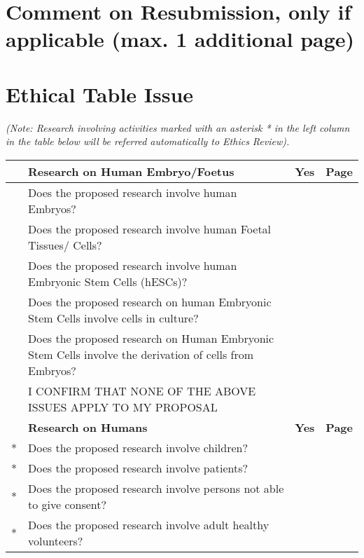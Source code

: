 \documentclass[11pt,twoside,a4paper]{article}
\begin{document}
\section{Comment on Resubmission, only if applicable (max. 1 additional page)}


\section*{Ethical Table Issue}

\emph{(Note: Research involving activities marked with an asterisk * in the left
  column in the table below will be referred automatically to Ethics Review).}


\begin{table}
    \centering
    \begin{tabular}{|c|p{}|c|c|}
        \hline
        \rowcolor{lightgray}
        & \textbf{Research on Human Embryo/Foetus} & \textbf{Yes} & \textbf{Page} \\\hline
        & Does the proposed research involve human Embryos? & & \\\hline
        & Does the proposed research involve human Foetal Tissues/ Cells? & & \\\hline
        & Does the proposed research involve human Embryonic Stem Cells (hESCs)? & & \\\hline
        & Does the proposed research on human Embryonic Stem Cells involve cells in culture? & & \\\hline
        & Does the proposed research on Human Embryonic Stem Cells involve the derivation of cells from Embryos? & & \\\hline
        & I CONFIRM THAT NONE OF THE ABOVE ISSUES APPLY TO MY PROPOSAL & &
        \\\hline
        \rowcolor{lightgray}
        & \textbf{Research on Humans}    & \textbf{Yes} & \textbf{Page} \\\hline
        * &  Does the proposed research involve children?  & & \\\hline
        * &  Does the proposed research involve patients?  & & \\\hline
        * &  Does the proposed research involve persons not able to give
        consent?  & & \\\hline
        * &  Does the proposed research involve adult healthy volunteers? & & \\\hline

\end{tabular}
\end{table}
\end{document}
